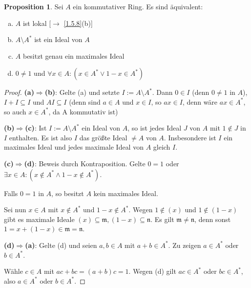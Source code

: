 \documentclass[
twoside=semi,
fontsize=12,
DIV=12, 
cleardoublepage=current,
leqno,
headings=optiontoheadandtoc, 
toc=idx
]{scrbook}
\theoremstyle{definition}
\newtheorem{proposition}[definition]{Proposition}
\begin{document}
 	\begin{proposition}\label{2.6.1}\hfill\newline
 		Sei $A$ ein kommutativer Ring. Es sind \"aquivalent:
 		\begin{enumerate}[(a)]
 			\item $A$ ist lokal [$\to$ \ref{1.5.8}(b)]
 			\item $A \setminus A^*$ ist ein Ideal von $A$
 			\item $A$ besitzt genau ein maximales Ideal
 			\item $0\neq 1$ und $\forall x \in A: (x \in A^* \lor 1-x \in A^*)$
 		\end{enumerate}
 	
 		\begin{proof}\hfill\newline
 			\textbf{(a)$\Longrightarrow$(b)}: Gelte (a) und setzte $I:= A \setminus A^*$. Dann $ 0 \in I$ (denn $0 \neq 1$ in $A$), $I + I \subseteq I$ und 
 			$AI \subseteq I$ (denn sind $a \in A$ und $x \in I$, so $ax \in I$, denn w\"are $ax \in A^*$, so auch $x \in A^*$, da A kommutativ ist)
 			
 			\medskip\noindent
 			\textbf{(b)$\Longrightarrow$(c)}: Ist $I := A \setminus A^*$ ein Ideal von $A$, so ist jedes Ideal $J$ von $A$ mit $1 \notin J$ in $I$ enthalten. Es ist also $I$ das gr\"o\ss te Ideal $\neq A$ von $A$.
 			Insbesondere ist $I$ ein maximales Ideal und jedes maximale Ideal von $A$ gleich $I$.
 			
 			\medskip\noindent
 			\textbf{(c)$\Longrightarrow$(d)}: Beweis durch Kontraposition. Gelte $0 = 1$ oder $\exists x \in A: (x \notin A^* \land 1-x \notin A^*)$. 
 			
 			Falls $0 = 1$ in $A$, so besitzt $A$ kein maximales Ideal. 
 			
 			Sei nun $x \in A$ mit $x \notin A^*$ und $1-x \notin A^*$. Wegen $1 \notin (x)$ und $1 \notin (1-x)$ gibt es maximale Ideale $(x) \subseteq \mathfrak{m}, (1-x) \subseteq \mathfrak{n}$. Es gilt $\mathfrak{m} \neq \mathfrak{n}$, denn sonst $1 = x + (1-x) \in \mathfrak{m} = \mathfrak{n}$.
 			
 			\medskip\noindent
 			\textbf{(d)$\Longrightarrow$(a)}: Gelte (d) und seien $a, b \in A$ mit $a+b \in A^*$. Zu zeigen $a \in A^*$ oder $b \in A^*$.
 			
 			W\"ahle $c \in A$ mit $ac+ bc = (a+b)c = 1$. Wegen (d) gilt $ac \in A^*$ oder $bc \in A^*$, also $a \in A^*$ oder $b \in A^*$.
 		\end{proof}
 	\end{proposition}
 
\end{document}
